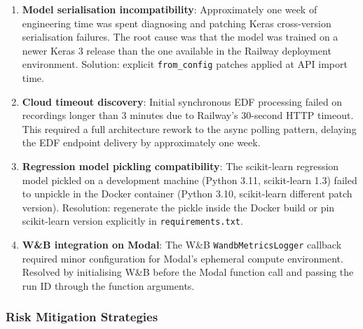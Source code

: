 \documentclass[10pt]{article}
\begin{document}
\begin{enumerate}
  \item \textbf{Model serialisation incompatibility}: Approximately one week of engineering time was spent diagnosing and patching Keras cross-version serialisation failures. The root cause was that the model was trained on a newer Keras 3 release than the one available in the Railway deployment environment. Solution: explicit \texttt{from\_config} patches applied at API import time.

  \item \textbf{Cloud timeout discovery}: Initial synchronous EDF processing failed on recordings longer than 3 minutes due to Railway's 30-second HTTP timeout. This required a full architecture rework to the async polling pattern, delaying the EDF endpoint delivery by approximately one week.

  \item \textbf{Regression model pickling compatibility}: The scikit-learn regression model pickled on a development machine (Python 3.11, scikit-learn 1.3) failed to unpickle in the Docker container (Python 3.10, scikit-learn different patch version). Resolution: regenerate the pickle inside the Docker build or pin scikit-learn version explicitly in \texttt{requirements.txt}.

  \item \textbf{W\&B integration on Modal}: The W\&B \texttt{WandbMetricsLogger} callback required minor configuration for Modal's ephemeral compute environment. Resolved by initialising W\&B before the Modal function call and passing the run ID through the function arguments.
\end{enumerate}

\subsubsection{Risk Mitigation Strategies}
\label{sec:riskMitigation}
\end{document}
